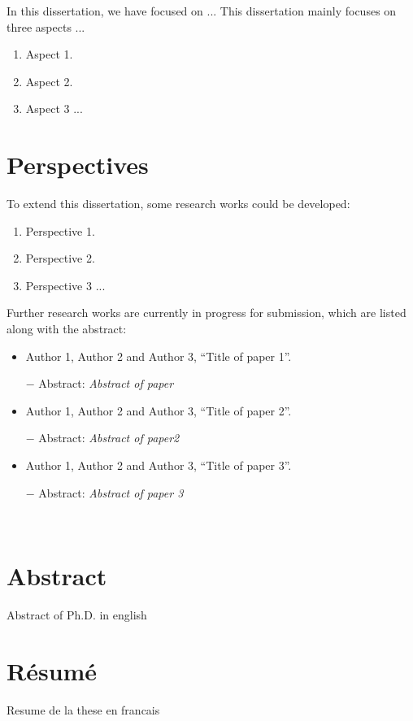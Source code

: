 \documentclass[a4paper, twoside, 12pt]{report}
\begin{document}
	In this dissertation, we have focused on ...
	This dissertation mainly focuses on three aspects ...
	
	\begin{enumerate}
		\item Aspect 1.
		
		\item Aspect 2.
		
		\item Aspect 3 ...
	\end{enumerate}
	
	\section*{Perspectives}
	
	To extend this dissertation, some research works could be developed:
	
	\begin{enumerate}
		\item Perspective 1.
		
		\item Perspective 2.
		
		\item Perspective 3 ...		
	\end{enumerate}
	
	Further research works are currently in progress for submission, which are listed along with the abstract:
	
	\begin{itemize}
		\item Author 1, Author 2 and Author 3, “Title of paper 1”.
		
		$-$ Abstract: \textit{Abstract of paper}
		
		\item Author 1, Author 2 and Author 3, “Title of paper 2”.
		
		$-$ Abstract: \textit{Abstract of paper2}
		
		\item Author 1, Author 2 and Author 3, “Title of paper 3”.
		
		$-$ Abstract: \textit{Abstract of paper 3}
		 
	\end{itemize}
	
		
	
	\newpage
	
	$~$
	
	\newpage
	
	
	
	
	\newpage
	
	\thispagestyle{empty}
	
	\mbox{}
	
	\newpage
	
	\newpage
	
	\section*{Abstract}
	
	Abstract of Ph.D. in english
	
	\section*{R\'esum\'e}
	
	Resume de la these en francais
	
\end{document}
